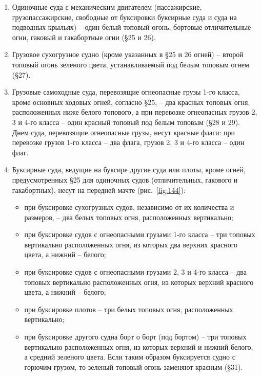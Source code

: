 \documentclass[a4paper, 12pt, twoside, final]{scrbook}
\begin{document}
\begin{enumerate}
\item Одиночные суда с механическим двигателем (пассажирские, грузопассажирские, свободные от буксировки буксирные суда и суда на подводных крыльях) \--- один белый топовый огонь, бортовые отличительные огни, гаковый и гакабортные огни (\S 25 и 26).

\item Грузовое сухогрузное судно (кроме указанных в \S 25 и 26 огней) \--- второй топовый огонь зеленого цвета, устанавливаемый под белым топовым огнем (\S 27).

\item Грузовые самоходные суда, перевозящие огнеопасные грузы 1-го класса, кроме основных ходовых огней, согласно \S 25, \--- два красных топовых огня, расположенных ниже белого топового, а при перевозке огнеопасных грузов 2, 3 и 4-го класса \--- один красный топовый под белым топовым (\S 28 и 29). Днем суда, перевозящие огнеопасные грузы, несут красные флаги: при перевозке грузов 1-го класса \--- два флага, грузов 2, 3 и 4-го класса \--- один флаг.

\item Буксирные суда, ведущие на буксире другие суда или плоты, кроме огней, предусмотренных \S 25 для одиночных судов (отличительных, гакового и гакабортных), несут на передней мачте (рис.~\ref{fig:144}):

\begin{itemize}
\item при буксировке сухогрузных судов, независимо от их количества и размеров, \--- два белых топовых огня, расположенных вертикально;

\item при буксировке судов с огнеопасными грузами 1-го класса \--- три топовых вертикально расположенных огня, из которых два верхних красного цвета, а нижний \--- белого;

\item при буксировке судов с огнеопасными грузами 2, 3 и 4-го класса \--- два топовых вертикально расположенных огня, из которых верхний красного цвета, а нижний \--- белого;

\item при буксировке плотов \--- три белых топовых огня, расположенных вертикально;

\item при буксировке другого судна борт о борт (под бортом) \--- три топовых вертикально расположенных огня, из которых верхний и нижний белого, а средний зеленого цвета. Если таким образом буксируется судно с горючим грузом, то зеленый топовый огонь заменяют красным (\S 31).
\end{itemize}


\end{enumerate}
\end{document}
